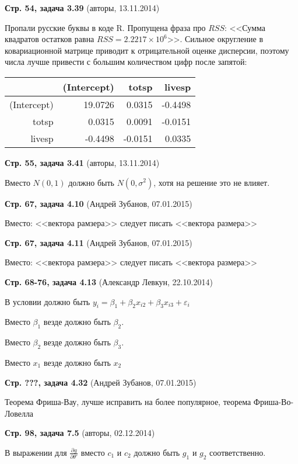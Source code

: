 \documentclass{article}
\newcommand{\erroronpage}[4]{\textbf{Стр. #1, #2} (#3, #4)}
\begin{document}
\erroronpage{54}{задача 3.39}{авторы}{13.11.2014}

Пропали русские буквы в коде R. Пропущена фраза про $RSS$:
<<Сумма квадратов остатков равна $RSS=\ensuremath{2.2217\times 10^{6}}$>>. 
Сильное округление в ковариационной матрице приводит к отрицательной оценке дисперсии, поэтому числа лучше привести с большим количеством цифр после запятой:

\begin{table}[ht]
\centering
\begin{tabular}{rrrr}
  \hline
 & (Intercept) & totsp & livesp \\ 
  \hline
(Intercept) & 19.0726 & 0.0315 & -0.4498 \\ 
  totsp & 0.0315 & 0.0091 & -0.0151 \\ 
  livesp & -0.4498 & -0.0151 & 0.0335 \\ 
   \hline
\end{tabular}
\end{table}


\erroronpage{55}{задача 3.41}{авторы}{13.11.2014}

Вместо $N(0, 1)$ должно быть $N(0, \sigma^2)$, хотя на решение это не влияет.

\erroronpage{67}{задача 4.10}{Андрей Зубанов}{07.01.2015}

Вместо: <<вектора рамзера>> следует писать <<вектора размера>> 

\erroronpage{67}{задача 4.11}{Андрей Зубанов}{07.01.2015}

Вместо: <<вектора рамзера>> следует писать <<вектора размера>> 

\erroronpage{68-76}{задача 4.13}{Александр Левкун}{22.10.2014}

В условии должно быть $y_i=\beta_1+\beta_2 x_{i2} + \beta_3 x_{i3}+\varepsilon_i$

Вместо $\beta_1$ везде должно быть $\beta_2$.

Вместо $\beta_2$ везде должно быть $\beta_3$.

Вместо $x_1$ везде должно быть $x_2$

\erroronpage{???}{задача 4.32}{Андрей Зубанов}{07.01.2015}

Теорема Фриша-Вау, лучше исправить на более популярное, теорема Фриша-Во-Ловелла

\erroronpage{98}{задача 7.5}{авторы}{02.12.2014}

В выражении для $\frac{\partial g}{\partial \theta'}$ вместо $c_1$ и $c_2$ должно быть $g_1$ и $g_2$ соответственно.
\end{document}
